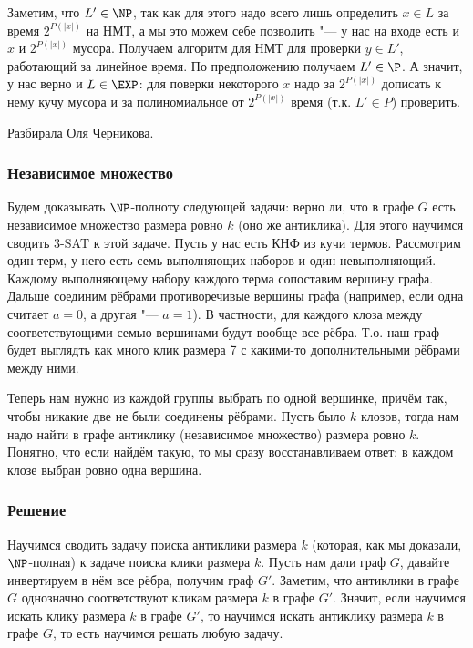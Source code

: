 	Заметим, что $L' \in \NP$, так как для этого надо всего лишь определить
	$x \in L$ за время $2^{P(|x|)}$ на НМТ, а мы это можем себе позволить "--- у нас на входе
	есть и $x$ и $2^{P(|x|)}$ мусора.
	Получаем алгоритм для НМТ для проверки $y \in L'$, работающий за линейное время.
	По предположению получаем $L' \in \P$.
	А значит, у нас верно и $L \in \EXP$: для поверки некоторого $x$ надо за $2^{P(|x|)}$ дописать
	к нему кучу мусора и за полиномиальное от $2^{P(|x|)}$ время (т.к. $L' \in P$) проверить.

	Разбирала Оля Черникова.

	\subsubsection{Независимое множество}
		Будем доказывать $\NP$-полноту следующей задачи: верно ли, что в графе $G$ есть независимое множество размера ровно $k$ (оно же антиклика).
		Для этого научимся сводить 3-SAT к этой задаче.
		Пусть у нас есть КНФ из кучи термов.
		Рассмотрим один терм, у него есть семь выполняющих наборов и один невыполняющий.
		Каждому выполняющему набору каждого терма сопоставим вершину графа.
		Дальше соединим рёбрами противоречивые вершины графа (например, если одна считает $a=0$, а другая "--- $a=1$).
		В частности, для каждого клоза между соответствующими семью вершинами будут вообще все рёбра.
		Т.о. наш граф будет выглядть как много клик размера 7 с какими-то дополнительными рёбрами между ними.

		Теперь нам нужно из каждой группы выбрать по одной вершинке, причём так, чтобы никакие две не были соединены рёбрами.
		Пусть было $k$ клозов, тогда нам надо найти в графе антиклику (независимое множество) размера ровно $k$.
		Понятно, что если найдём такую, то мы сразу восстанавливаем ответ: в каждом клозе выбран ровно одна вершина.

	\subsubsection{Решение}
		Научимся сводить задачу поиска антиклики размера $k$ (которая, как мы доказали, $\NP$-полная) к задаче поиска клики размера $k$.
		Пусть нам дали граф $G$, давайте инвертируем в нём все рёбра, получим граф $G'$.
		Заметим, что антиклики в графе $G$ однозначно соответствуют кликам размера $k$ в графе $G'$.
		Значит, если научимся искать клику размера $k$ в графе $G'$, то научимся искать антиклику размера
		$k$ в графе $G$, то есть научимся решать любую задачу.

